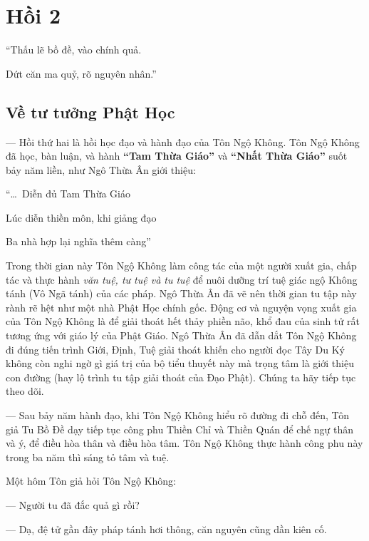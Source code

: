 \chapter{Hồi 2} %
\label{cha:hoi_2}


\begin{itshape}
``Thấu lẽ bồ đề, vào chính quả.

Dứt căn ma quỷ, rõ nguyên nhân.''
\end{itshape}

\section{Về tư tưởng Phật Học} %
\label{sec:2_tu_tuong_phat_hoc}

--- Hồi thứ hai là hồi học đạo và hành đạo của Tôn Ngộ Không. Tôn Ngộ Không đã học, bàn luận, và hành {\bf ``Tam Thừa Giáo''} và {\bf ``Nhất Thừa Giáo''} suốt bảy năm liền, như Ngô Thừa Ân giới thiệu:

\begin{itshape}
``\ldots ~Diễn đủ Tam Thừa Giáo

Lúc diễn thiền môn, khi giảng đạo

Ba nhà hợp lại nghĩa thêm càng''
\end{itshape}

Trong thời gian này Tôn Ngộ Không làm công tác của một người xuất gia, chấp tác và thực hành \emph{văn tuệ, tư tuệ và tu tuệ} để nuôi dưỡng trí tuệ giác ngộ Không tánh (Vô Ngã tánh) của các pháp. Ngô Thừa Ân đã vẽ nên thời gian tu tập này rành rẽ hệt như một nhà Phật Học chính gốc. Động cơ và nguyện vọng xuất gia của Tôn Ngộ Không là để giải thoát hết thảy phiền não, khổ đau của sinh tử rất tương ứng với giáo lý của Phật Giáo. Ngô Thừa Ân đã dẫn dắt Tôn Ngộ Không đi đúng tiến trình Giới, Định, Tuệ giải thoát khiến cho người đọc Tây Du Ký không còn nghi ngờ gì giá trị của bộ tiểu thuyết này mà trọng tâm là giới thiệu con đường (hay lộ trình tu tập giải thoát của Đạo Phật). Chúng ta hãy tiếp tục theo dõi.

--- Sau bảy năm hành đạo, khi Tôn Ngộ Không hiểu rõ đường đi chỗ đến, Tôn giả Tu Bồ Đề dạy tiếp tục công phu Thiền Chỉ và Thiền Quán để chế ngự thân và ý, để điều hòa thân và điều hòa tâm. Tôn Ngộ Không thực hành công phu này trong ba năm thì sáng tỏ tâm và tuệ.

Một hôm Tôn giả hỏi Tôn Ngộ Không:

--- Người tu đã đắc quả gì rồi?

--- Dạ, đệ tử gần đây pháp tánh hơi thông, căn nguyên cũng dần kiên cố.

